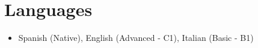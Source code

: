 \documentclass[letterpaper,11pt]{article}
\newcommand{\resumeItem}[1]{
  \item\small{
    {#1 \vspace{-2pt}}
  }
}
\newcommand{\resumeItemListStart}{\begin{itemize}}
\newcommand{\resumeItemListEnd}{\end{itemize}\vspace{-5pt}}
\begin{document}
%
\section{Languages}
\resumeItemListStart
    \resumeItem{Spanish (Native), English (Advanced - C1), Italian (Basic - B1)}
\resumeItemListEnd

%
\end{document}
